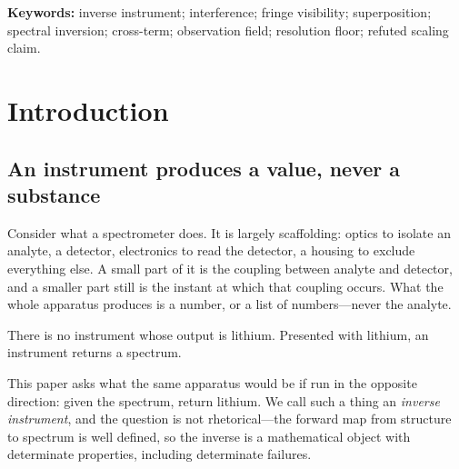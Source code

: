 \documentclass[11pt,twocolumn,a4paper]{article}
\theoremstyle{upthm}
\theoremstyle{definition}
\theoremstyle{remark}
\begin{document}
\begin{abstract}
We are explicit about three further limits. Address resolution names a
unique structure for only $27$ of $39$ at full depth, so the addressing
route is a screen and the interference route is what achieves $39/39$.
The phase term, which carries the coordinate information, is fragile:
under $1\%$ frequency perturbation a phaseless control \emph{outperforms}
the full comparison, $36$ against $27$, and the full comparison only wins
from $5\%$ (). And the instrument's floor is set by a
declared detectability threshold rather than by sampling---the smallest
detectable detuning is $0.3$~cm$^{-1}$, a factor $0.017$ of the grid cell
width.
\end{abstract}

\noindent\textbf{Keywords:} inverse instrument; interference; fringe
visibility; superposition; spectral inversion; cross-term; observation
field; resolution floor; refuted scaling claim.

\tableofcontents

\section{Introduction}
\label{sec:intro}

\subsection{An instrument produces a value, never a substance}

Consider what a spectrometer does. It is largely scaffolding: optics to
isolate an analyte, a detector, electronics to read the detector, a
housing to exclude everything else. A small part of it is the coupling
between analyte and detector, and a smaller part still is the instant at
which that coupling occurs. What the whole apparatus produces is a
number, or a list of numbers---never the analyte.

There is no instrument whose output is lithium. Presented with lithium,
an instrument returns a spectrum.

This paper asks what the same apparatus would be if run in the opposite
direction: given the spectrum, return lithium. We call such a thing an
\emph{inverse instrument}, and the question is not rhetorical---the
forward map from structure to spectrum is well defined, so the inverse
is a mathematical object with determinate properties, including
determinate failures.
\end{document}
